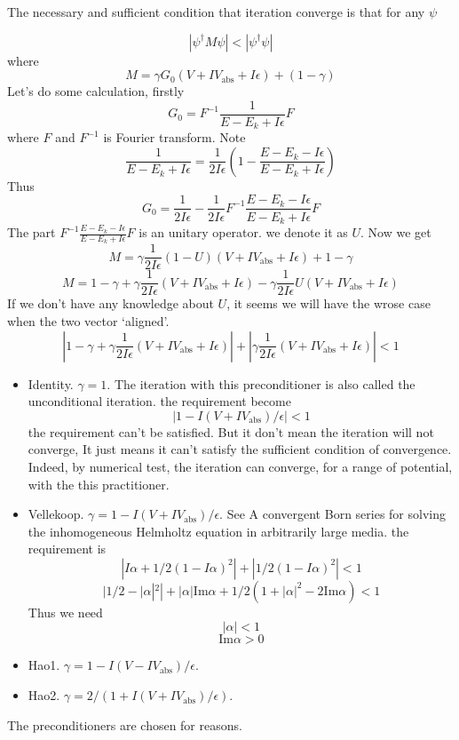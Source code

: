 \documentclass[12pt,twoside]{article}
\begin{document}
The necessary and sufficient condition that iteration converge is that for any $\psi$

$$
\left|\psi^\dagger M\psi\right| < |\psi^\dagger\psi|
$$
where
$$
M = \gamma G_0 (V+IV_\text{abs}+I\epsilon) + (1-\gamma)
$$
Let's do some calculation, firstly
$$
G_0 = F^{-1} \frac{1}{E-E_k+I\epsilon} F
$$
where $F$ and $F^{-1}$ is Fourier transform. Note
$$
\frac{1}{E-E_k+I\epsilon} =\frac{1}{2I\epsilon}\left( 1- \frac{E-E_k-I\epsilon}{E-E_k+I\epsilon}\right)
$$
Thus
$$
G_0 = \frac{1}{2I\epsilon} - \frac{1}{2I\epsilon}F^{-1}  \frac{E-E_k-I\epsilon}{E-E_k+I\epsilon} F
$$
The part
 $F^{-1}  \frac{E-E_k-I\epsilon}{E-E_k+I\epsilon} F$ is an unitary operator. we denote it as $U$.
Now we get
$$
M = \gamma  \frac{1}{2I\epsilon} (1 - U) (V + IV_\text{abs} + I\epsilon) + 1 -\gamma
$$
$$
M = 1 -\gamma + \gamma  \frac{1}{2I\epsilon} (V + IV_\text{abs} + I\epsilon)  - \gamma  \frac{1}{2I\epsilon} U (V + IV_\text{abs} + I\epsilon)
$$
If we don't have any knowledge about $U$, it seems we will have the wrose case when the two vector `aligned'.
$$
|1 -\gamma + \gamma  \frac{1}{2I\epsilon} (V + IV_\text{abs} + I\epsilon)| + |\gamma  \frac{1}{2I\epsilon} (V + IV_\text{abs} + I\epsilon)| < 1
$$


\begin{itemize}
  \item Identity. $\gamma=1$. The iteration with this preconditioner is also called the unconditional iteration.
  the requirement become
$$
\left| 1 - I(V + IV_\text{abs})/\epsilon\right| < 1
$$
the requirement can't be satisfied. But it don't mean the iteration will not converge, It just means it can't satisfy the sufficient condition of convergence. Indeed, by numerical test, the iteration can converge, for a range of potential, with the this practitioner.

  \item Vellekoop. $\gamma=1 - I (V+IV_\text{abs}) /\epsilon$. See A convergent Born series for solving the inhomogeneous Helmholtz equation in arbitrarily large media. the requirement is
      $$
      |I\alpha + 1/2(1-I\alpha)^2|+|1/2(1-I\alpha)^2| < 1
      $$
      $$
        |1/2 - |\alpha|^2| + |\alpha|\text{Im}\alpha + 1/2(1+|\alpha|^2-2\text{Im}\alpha)<1
      $$
      Thus we need
      $$
      |\alpha| < 1
      $$
      $$
      \text{Im}\alpha > 0
      $$
 \item Hao1. $\gamma=1 - I (V-IV_\text{abs}) /\epsilon$.
  \item Hao2. $\gamma=2/(1 + I (V+IV_\text{abs}) / \epsilon)$.
\end{itemize}
The preconditioners are chosen for reasons.
\end{document}
